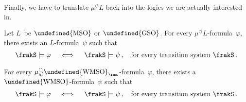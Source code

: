 \documentclass[10pt, fleqn]{scrartcl}
\makeatletter
\newcommand\m@thsm@ller[2]{\mbox{\relscale{0.91}$\m@th#1#2$}}
\let\smaller\undefined
\DeclareRobustCommand\smaller[1]{\relax\ifmmode{\mathpalette\m@thsm@ller{#1}}\else{\relscale{0.91}#1}\fi}
\newcommand*{\WMSO}{\smaller{\mathrm{WMSO}}}
\newcommand*{\MSO}{\smaller{\mathrm{MSO}}}
\newcommand*{\GSO}{\smaller{\mathrm{GSO}}}
\newcommand*{\muaf}{\mu_{\mathrm{af}}}
\newcommand*{\?}{\kern .08em}
\newcommand\rcirclearrowleft{\circlearrowleft}
\makeatother
\begin{document}
Finally, we have to translate $\mu^\rcirclearrowleft L$ back into the logics we are actually
interested in.
\begin{Lem}\label{Lem: mu L to L}\leavevmode
\begin{enuma}
\item Let $L$~be\/ $\MSO$ or\/ $\GSO$.
  For every $\mu^\rcirclearrowleft L$-formula~$\varphi$, there exists an $L$-formula~$\psi$
  such that
  \begin{align*}
    \frakS \models \varphi \quad\iff\quad \frakS \models \psi\,,
    \quad\text{for every transition system } \frakS\,.
  \end{align*}
\item For every $\muaf^\rcirclearrowleft \WMSO_\rmc$-formula~$\varphi$, there exists
  a\/ $\WMSO$-formula~$\psi$ such that
  \begin{align*}
    \frakS \models \varphi \quad\iff\quad \frakS \models \psi\,,
    \quad\text{for every transition system } \frakS\,.
  \end{align*}
\end{enuma}
\end{Lem}
\end{document}
